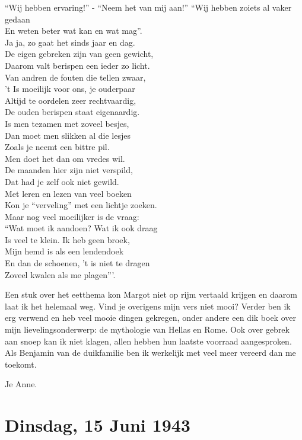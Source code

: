 \documentclass{book}
\begin{document}
``Wij hebben ervaring!'' - ``Neem het van mij aan!'' ``Wij hebben zoiets al
vaker gedaan\\
En weten beter wat kan en wat mag''.\\
Ja ja, zo gaat het sinds
jaar en dag.\\
De eigen gebreken zijn van geen gewicht,\\
Daarom valt berispen
een ieder zo licht.\\
Van andren de fouten die tellen zwaar,\\
't Is moeilijk
voor ons, je ouderpaar\\
Altijd te oordelen zeer rechtvaardig,\\
De ouden
berispen staat eigenaardig.\\
Is men tezamen met zoveel besjes,\\
Dan moet men
slikken al die lesjes\\
Zoals je neemt een bittre pil.\\
Men doet het dan om
vredes wil.\\
De maanden hier zijn niet verspild,\\
Dat had je zelf ook niet
gewild.\\
Met leren en lezen van veel boeken\\
Kon je ``verveling'' met een
lichtje zoeken.\\
Maar nog veel moeilijker is de vraag:\\
``Wat moet ik aandoen?
Wat ik ook draag\\
Is veel te klein. Ik heb geen broek,\\
Mijn hemd is als een
lendendoek\\
En dan de schoenen, 't is niet te dragen\\
Zoveel kwalen als me
plagen'''.

Een stuk over het eetthema kon Margot niet op rijm vertaald krijgen en daarom
laat ik het helemaal weg. Vind je overigens mijn vers niet mooi?  Verder ben ik
erg verwend en heb veel mooie dingen gekregen, onder andere een dik boek over
mijn lievelingsonderwerp: de mythologie van Hellas en Rome. Ook over gebrek aan
snoep kan ik niet klagen, allen hebben hun laatste voorraad aangesproken. Als
Benjamin van de duikfamilie ben ik werkelijk met veel meer vereerd dan me
toekomt.

Je Anne.

\section*{Dinsdag, 15 Juni 1943}
\end{document}
